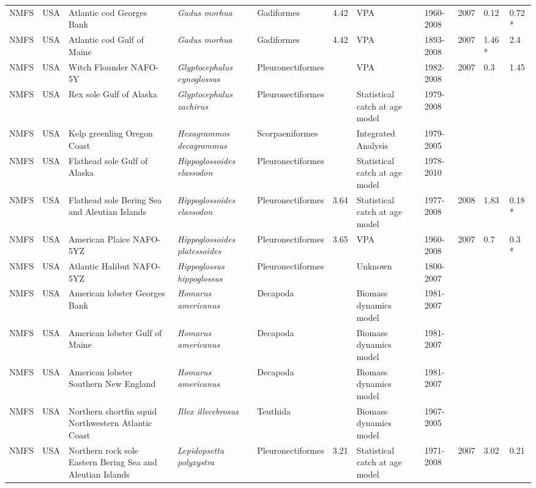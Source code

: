 \begin{longtable}{p{1.5cm}p{1.5cm}p{3cm}p{3cm}p{2.5cm}p{0.9cm}p{1.4cm}p{0.9cm}p{0.9cm}p{0.9cm}p{1cm}}
  NMFS & USA & Atlantic cod Georges Bank & \textit{Gadus morhua} & Gadiformes & 4.42 & VPA & 1960-2008 & 2007 & 0.12 & 0.72 * \\ 
  NMFS & USA & Atlantic cod Gulf of Maine & \textit{Gadus morhua} & Gadiformes & 4.42 & VPA & 1893-2008 & 2007 & 1.46 * & 2.4 \\ 
  NMFS & USA & Witch Flounder NAFO-5Y & \textit{Glyptocephalus cynoglossus} & Pleuronectiformes &  & VPA & 1982-2008 & 2007 & 0.3 & 1.45 \\ 
  NMFS & USA & Rex sole Gulf of Alaska & \textit{Glyptocephalus zachirus} & Pleuronectiformes &  & Statistical catch at age model & 1979-2008 &  &  &  \\ 
  NMFS & USA & Kelp greenling Oregon Coast & \textit{Hexagrammos decagrammus} & Scorpaeniformes &  & Integrated Analysis & 1979-2005 &  &  &  \\ 
  NMFS & USA & Flathead sole Gulf of Alaska & \textit{Hippoglossoides elassodon} & Pleuronectiformes &  & Statistical catch at age model & 1978-2010 &  &  &  \\ 
  NMFS & USA & Flathead sole Bering Sea and Aleutian Islands & \textit{Hippoglossoides elassodon} & Pleuronectiformes & 3.64 & Statistical catch at age model & 1977-2008 & 2008 & 1.83 & 0.18 * \\ 
  NMFS & USA & American Plaice NAFO-5YZ & \textit{Hippoglossoides platessoides} & Pleuronectiformes & 3.65 & VPA & 1960-2008 & 2007 & 0.7 & 0.3 * \\ 
  NMFS & USA & Atlantic Halibut NAFO-5YZ & \textit{Hippoglossus hippoglossus} & Pleuronectiformes &  & Unknown & 1800-2007 &  &  &  \\ 
  NMFS & USA & American lobster Georges Bank & \textit{Homarus americanus} & Decapoda &  & Biomass dynamics model & 1981-2007 &  &  &  \\ 
  NMFS & USA & American lobster Gulf of Maine & \textit{Homarus americanus} & Decapoda &  & Biomass dynamics model & 1981-2007 &  &  &  \\ 
  NMFS & USA & American lobster Southern New England & \textit{Homarus americanus} & Decapoda &  & Biomass dynamics model & 1981-2007 &  &  &  \\ 
  NMFS & USA & Northern shortfin squid Northwestern Atlantic Coast & \textit{Illex illecebrosus} & Teuthida &  & Biomass dynamics model & 1967-2005 &  &  &  \\ 
  NMFS & USA & Northern rock sole Eastern Bering Sea and Aleutian Islands & \textit{Lepidopsetta polyxystra} & Pleuronectiformes & 3.21 & Statistical catch at age model & 1971-2008 & 2007 & 3.02 & 0.21 \\ 

\end{longtable}
